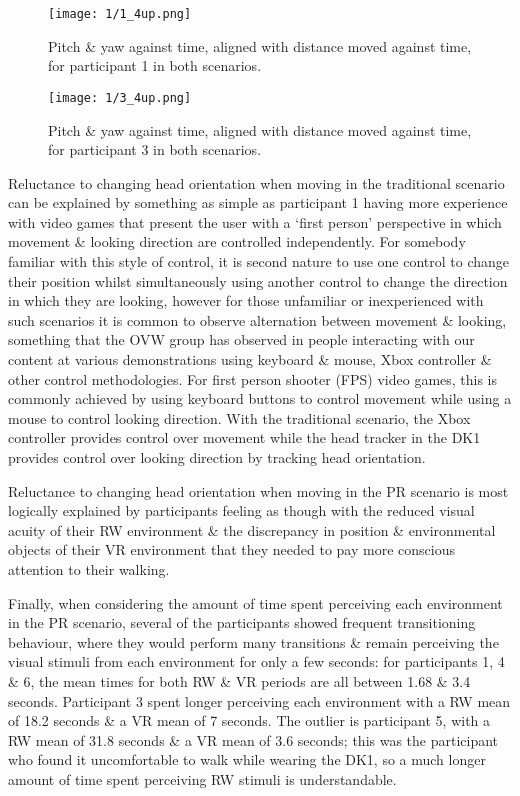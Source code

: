 \begin{figure}
	\begin{center}
	\texttt{[image: 1/1\_4up.png]}
	\caption{Pitch \& yaw against time, aligned with distance moved against time, for participant 1 in both scenarios.}
	\label{1_4up.png}
	\end{center}
\end{figure}

\begin{figure}
	\begin{center}
	\texttt{[image: 1/3\_4up.png]}
	\caption{Pitch \& yaw against time, aligned with distance moved against time, for participant 3 in both scenarios.}
	\label{3_4up.png}
	\end{center}
\end{figure}

Reluctance to changing head orientation when moving in the traditional scenario can be explained by something as simple as participant 1 having more experience with video games that present the user with a `first person' perspective in which movement \& looking direction are controlled independently. For somebody familiar with this style of control, it is second nature to use one control to change their position whilst simultaneously using another control to change the direction in which they are looking, however for those unfamiliar or inexperienced with such scenarios it is common to observe alternation between movement \& looking, something that the OVW group has observed in people interacting with our content at various demonstrations using keyboard \& mouse, Xbox controller \& other control methodologies. For first person shooter (FPS) video games, this is commonly achieved by using keyboard buttons to control movement while using a mouse to control looking direction. With the traditional scenario, the Xbox controller provides control over movement while the head tracker in the DK1 provides control over looking direction by tracking head orientation.

Reluctance to changing head orientation when moving in the PR scenario is most logically explained by participants feeling as though with the reduced visual acuity of their RW environment \& the discrepancy in position \& environmental objects of their VR environment that they needed to pay more conscious attention to their walking.


Finally, when considering the amount of time spent perceiving each environment in the PR scenario, several of the participants showed frequent transitioning behaviour, where they would perform many transitions \& remain perceiving the visual stimuli from each environment for only a few seconds: for participants 1, 4 \& 6, the mean times for both RW \& VR periods are all between 1.68 \& 3.4 seconds. Participant 3 spent longer perceiving each environment with a RW mean of 18.2 seconds \& a VR mean of 7 seconds. The outlier is participant 5, with a RW mean of 31.8 seconds \& a VR mean of 3.6 seconds; this was the participant who found it uncomfortable to walk while wearing the DK1, so a much longer amount of time spent perceiving RW stimuli is understandable.

